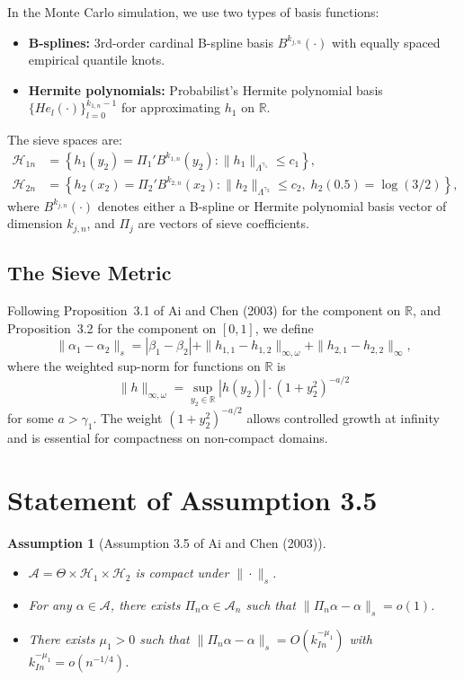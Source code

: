 \documentclass[12pt]{article}
\newtheorem{assumption}{Assumption}
\begin{document}
In the Monte Carlo simulation, we use two types of basis functions:
\begin{itemize}
\item \textbf{B-splines:} 3rd-order cardinal B-spline basis $B^{k_{j,n}}(\cdot)$ with equally spaced empirical quantile knots.
\item \textbf{Hermite polynomials:} Probabilist's Hermite polynomial basis $\{He_l(\cdot)\}_{l=0}^{k_{1,n}-1}$ for approximating $h_1$ on $\mathbb{R}$.
\end{itemize}

The sieve spaces are:
\begin{align}
\mathcal{H}_{1n} &= \left\{ h_1(y_2) = \Pi_1' B^{k_{1,n}}(y_2) : \|h_1\|_{\Lambda^{\gamma_1}} \leq c_1 \right\}, \label{eq:H1n}\\
\mathcal{H}_{2n} &= \left\{ h_2(x_2) = \Pi_2' B^{k_{2,n}}(x_2) : \|h_2\|_{\Lambda^{\gamma_2}} \leq c_2,\; h_2(0.5) = \log(3/2) \right\}, \label{eq:H2n}
\end{align}
where $B^{k_{j,n}}(\cdot)$ denotes either a B-spline or Hermite polynomial basis vector of dimension $k_{j,n}$, and $\Pi_j$ are vectors of sieve coefficients.

\subsection{The Sieve Metric}

Following Proposition~3.1 of Ai and Chen (2003) for the component on $\mathbb{R}$, and Proposition~3.2 for the component on $[0,1]$, we define
\begin{equation}\label{eq:metric}
\|\alpha_1 - \alpha_2\|_s = |\beta_1 - \beta_2| + \|h_{1,1} - h_{1,2}\|_{\infty, \omega} + \|h_{2,1} - h_{2,2}\|_{\infty},
\end{equation}
where the weighted sup-norm for functions on $\mathbb{R}$ is
\[
\|h\|_{\infty, \omega} = \sup_{y_2 \in \mathbb{R}} |h(y_2)| \cdot (1 + y_2^2)^{-a/2}
\]
for some $a > \gamma_1$. The weight $(1+y_2^2)^{-a/2}$ allows controlled growth at infinity and is essential for compactness on non-compact domains.

\bigskip

\section{Statement of Assumption 3.5}

\begin{assumption}[Assumption 3.5 of Ai and Chen (2003)]\label{ass:35}
\begin{itemize}
\item[\textbf{(i)}] $\mathcal{A} = \Theta \times \mathcal{H}_1 \times \mathcal{H}_2$ is compact under $\|\cdot\|_s$.
\item[\textbf{(ii)}] For any $\alpha \in \mathcal{A}$, there exists $\Pi_n \alpha \in \mathcal{A}_n$ such that $\|\Pi_n \alpha - \alpha\|_s = o(1)$.
\item[\textbf{(iii)}] There exists $\mu_1 > 0$ such that $\|\Pi_n \alpha - \alpha\|_s = O(k_{In}^{-\mu_1})$ with $k_{In}^{-\mu_1} = o(n^{-1/4})$.
\end{itemize}
\end{assumption}
\end{document}
